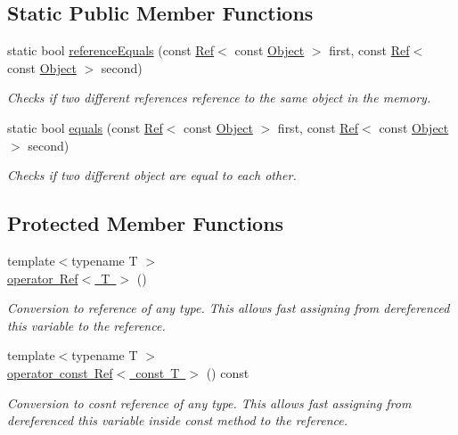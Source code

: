 \subsection*{Static Public Member Functions}
\begin{DoxyCompactItemize}
\item 
static bool \mbox{\hyperlink{class_object_a2e262342c487ea7aac9059ff0ca82b29}{reference\+Equals}} (const \mbox{\hyperlink{class_ref}{Ref}}$<$ const \mbox{\hyperlink{class_object}{Object}} $>$ first, const \mbox{\hyperlink{class_ref}{Ref}}$<$ const \mbox{\hyperlink{class_object}{Object}} $>$ second)
\begin{DoxyCompactList}\small\item\em Checks if two different references reference to the same object in the memory. \end{DoxyCompactList}\item 
static bool \mbox{\hyperlink{class_object_a0e9be30be18b9cc7db1e6788c6b8599f}{equals}} (const \mbox{\hyperlink{class_ref}{Ref}}$<$ const \mbox{\hyperlink{class_object}{Object}} $>$ first, const \mbox{\hyperlink{class_ref}{Ref}}$<$ const \mbox{\hyperlink{class_object}{Object}} $>$ second)
\begin{DoxyCompactList}\small\item\em Checks if two different object are equal to each other. \end{DoxyCompactList}\end{DoxyCompactItemize}
\subsection*{Protected Member Functions}
\begin{DoxyCompactItemize}
\item 
{\footnotesize template$<$typename T $>$ }\\\mbox{\hyperlink{class_object_af1fedc8e131c2654cd31830786efc720}{operator Ref$<$ T $>$}} ()
\begin{DoxyCompactList}\small\item\em Conversion to reference of any type. This allows fast assigning from dereferenced this variable to the reference. \end{DoxyCompactList}\item 
{\footnotesize template$<$typename T $>$ }\\\mbox{\hyperlink{class_object_ad552aa04f3c6954d73ea7611c169853c}{operator const Ref$<$ const T $>$}} () const
\begin{DoxyCompactList}\small\item\em Conversion to cosnt reference of any type. This allows fast assigning from dereferenced this variable inside const method to the reference. \end{DoxyCompactList}\end{DoxyCompactItemize}


